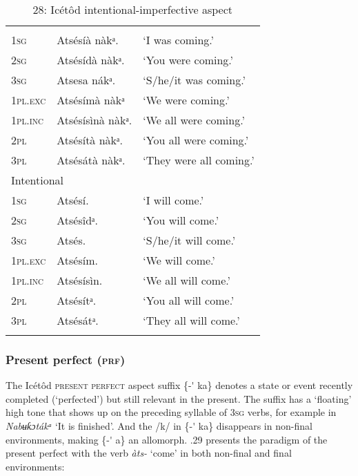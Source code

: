 \begin{table}
\caption{28: Icétôd intentional-imperfective aspect}
\label{tab:8}


\begin{tabularx}{\textwidth}{XXX}
\lsptoprule

\multicolumn{2}{X}{Imperfective} & \\
\textsc{1sg} & Atsésíà nàkᵃ. & ‘I was coming.’\\
\textsc{2sg} & Atsésídà nàkᵃ. & ‘You were coming.’\\
\textsc{3sg} & Atsesa nákᵃ. & ‘S/he/it was coming.’\\
\textsc{1pl.exc} & Atsésímà nàkᵃ & ‘We were coming.’\\
\textsc{1pl.inc} & Atsésísìnà nàkᵃ. & ‘We all were coming.’\\
\textsc{2pl} & Atsésítà nàkᵃ. & ‘You all were coming.’\\
\textsc{3pl} & Atsésátà nàkᵃ. & ‘They were all coming.’\\
\multicolumn{2}{X}{Intentional} & \\
\textsc{1sg} & Atsésí. & ‘I will come.’\\
\textsc{2sg} & Atsésîdᵃ. & ‘You will come.’\\
\textsc{3sg} & Atsés. & ‘S/he/it will come.’\\
\textsc{1pl.exc} & Atsésím. & ‘We will come.’\\
\textsc{1pl.inc} & Atsésísìn. & ‘We all will come.’\\
\textsc{2pl} & Atsésítᵃ. & ‘You all will come.’\\
\textsc{3pl} & Atsésátᵃ. & ‘They all will come.’\\
\lspbottomrule
\end{tabularx}
\end{table}

\subsubsection{Present perfect (\textsc{prf})}

The Icétôd \textsc{present perfect} aspect suffix \{-\'{} ka\} denotes a state or event recently completed (‘perfected’) but still relevant in the present. The suffix has a ‘floating’ high tone that shows up on the preceding syllable of 3\textsc{sg} verbs, for example in \textit{Nabʉƙɔtákᵃ} ‘It is finished’. And the /k/ in \{-\'{} ka\} disappears in non-final environments, making \{-\'{} a\} an allomorph. .29 presents the paradigm of the present perfect with the verb \textit{àts-} ‘come’ in both non-final and final environments:


